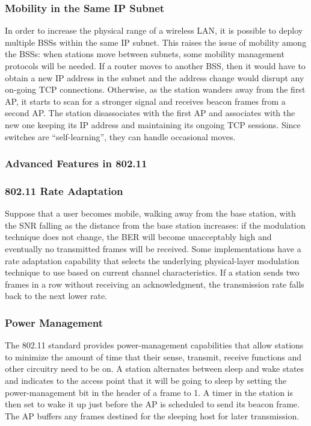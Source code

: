 \documentclass{article}
\begin{document}
\subsubsection{Mobility in the Same IP Subnet}
In order to increase the physical range of a wireless LAN, it is possible to deploy multiple BSSs within the same IP subnet. 
This raises the issue of mobility among the BSSs: when stations move between subnets, some mobility management protocols will be needed.
If a router moves to another BSS, then it would have to obtain a new IP address in the subnet and the address change would disrupt any on-going TCP connections.
Otherwise, as the station wanders away from the first AP, it starts to scan for a stronger signal and receives beacon frames from a second AP.
The station disassociates with the first AP and associates with the new one keeping its IP address and maintaining its ongoing TCP sessions. 
Since switches are “self-learning”, they can handle occasional moves.
\subsubsection{Advanced Features in 802.11}
\subsubsection*{802.11 Rate Adaptation}
Suppose that a user becomes mobile, walking away from the base station, with the SNR falling as the distance from the base station increases: if the modulation technique does not change, the BER will become unacceptably high and eventually no transmitted frames will be received.
Some implementations have a rate adaptation capability that selects the underlying physical-layer modulation technique to use based on current channel characteristics.
If a station sends two frames in a row without receiving an acknowledgment, the transmission rate falls back to the next lower rate.
\subsubsection*{Power Management}
The 802.11 standard provides power-management capabilities that allow stations to minimize the amount of time that their sense, transmit, receive functions and other circuitry need to be on.
A station alternates between sleep and wake states and indicates to the access point that it will be going to sleep by setting the power-management bit in the header of a frame to 1.
A timer in the station is then set to wake it up just before the AP is scheduled to send its beacon frame.
The AP buffers any frames destined for the sleeping host for later transmission.
\end{document}
